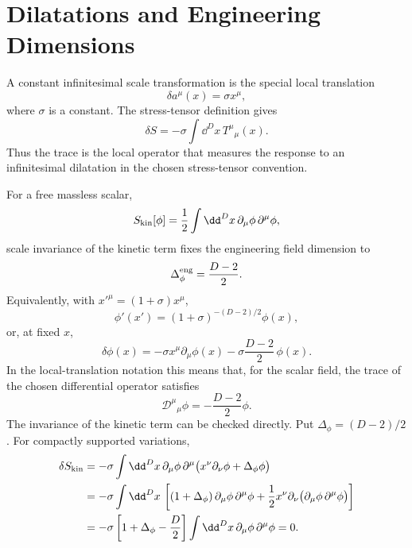\section{Dilatations and Engineering Dimensions}

A constant infinitesimal scale transformation is the special local
translation
\[
  \delta a^\mu(x)=\sigma x^\mu,
\]
where \(\sigma\) is a constant.  The stress-tensor definition gives
\[
  \delta S
  =
  -\sigma\int\dd^D x\,T^\mu{}_\mu(x).
\]
Thus the trace is the local operator that measures the response to an
infinitesimal dilatation in the chosen stress-tensor convention.

For a free massless scalar,
\[
  S_{\rm kin}[\phi]
  =
  \frac12\int\dd^D x\,\partial_\mu\phi\,\partial^\mu\phi,
\]
scale invariance of the kinetic term fixes the engineering field dimension to
\[
  \Delta_\phi^{\rm eng}=\frac{D-2}{2}.
\]
Equivalently, with \(x'^\mu=(1+\sigma)x^\mu\),
\[
  \phi'(x')
  =
  (1+\sigma)^{-(D-2)/2}\phi(x),
\]
or, at fixed \(x\),
\[
  \delta\phi(x)
  =
  -\sigma x^\mu\partial_\mu\phi(x)
  -
  \sigma\frac{D-2}{2}\,\phi(x).
\]
In the local-translation notation this means that, for the scalar field, the
trace of the chosen differential operator satisfies
\[
  \mathcal D^\mu{}_\mu\phi
  =
  -\frac{D-2}{2}\phi .
\]
The invariance of the kinetic term can be checked directly.  Put
\(\Delta_\phi=(D-2)/2\).  For compactly supported variations,
\begin{equation}
\label{eq:volume-ii-kinetic-scale-invariance-check}
\begin{aligned}
  \delta S_{\rm kin}
  &=
  -\sigma\int\dd^D x\,
  \partial_\mu\phi\,
  \partial^\mu\bigl(x^\nu\partial_\nu\phi+\Delta_\phi\phi\bigr)       \\
  &=
  -\sigma\int\dd^D x\,
  \left[
    (1+\Delta_\phi)\,\partial_\mu\phi\,\partial^\mu\phi
    +
    \frac12 x^\nu\partial_\nu
    \bigl(\partial_\mu\phi\,\partial^\mu\phi\bigr)
  \right]                                                            \\
  &=
  -\sigma\left[
    1+\Delta_\phi-\frac{D}{2}
  \right]
  \int\dd^D x\,\partial_\mu\phi\,\partial^\mu\phi
  =
  0 .
\end{aligned}
\end{equation}

